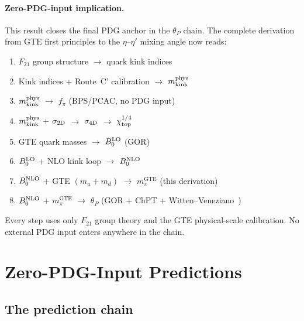 \documentclass[11pt]{article}
\theoremstyle{remark}
\newcommand{\GTE}{\text{GTE}}
\newcommand{\Ftwentyone}{F_{21}}
\begin{document}
\paragraph{Zero-PDG-input implication.}
This result closes the final PDG anchor in the $\theta_P$ chain.
The complete derivation from GTE first principles to the $\eta$--$\eta'$
mixing angle now reads:
\begin{enumerate}[leftmargin=2em]
\item $\Ftwentyone$ group structure $\to$ quark kink indices
\item Kink indices + Route~C' calibration $\to$ $m_{\rm kink}^{\rm phys}$
\item $m_{\rm kink}^{\rm phys}$ $\to$ $f_\pi$ (BPS/PCAC, no PDG input)
\item $m_{\rm kink}^{\rm phys}$ + $\sigma_{2\rm D}$ $\to$ $\sigma_{4\rm D}$
  $\to$ $\chi_{\rm top}^{1/4}$
\item GTE quark masses $\to$ $B_0^{\rm LO}$ (GOR)
\item $B_0^{\rm LO}$ + NLO kink loop $\to$ $B_0^{\rm NLO}$
\item $B_0^{\rm NLO}$ + GTE $(m_u{+}m_d)$ $\to$
  $m_\pi^{\GTE}$ (this derivation)
\item $B_0^{\rm NLO}$ + $m_\pi^{\GTE}$ $\to$ $\theta_P$
  (GOR + ChPT + Witten--Veneziano~\cite{Witten1979UA1,Veneziano1979})
\end{enumerate}
Every step uses only $\Ftwentyone$ group theory and the GTE physical-scale
calibration.
No external PDG input enters anywhere in the chain.

\section{Zero-PDG-Input Predictions}
\label{sec:zeropdg}

\subsection{The prediction chain}
\label{ssec:chain}
\end{document}
